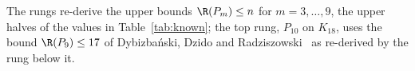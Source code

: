 The rungs
re-derive the upper bounds $\R(P_m)\le n$ for $m=3,\dots,9$, the upper
halves of the values in Table~\ref{tab:known}; the top rung, $P_{10}$ on
$K_{18}$, uses the bound $\R(P_9)\le17$ of Dybizbański, Dzido and
Radziszowski~\cite{DDR16} as re-derived by the rung below it.
